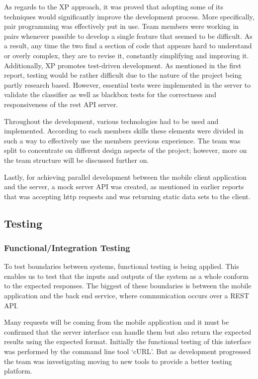 As regards to the XP approach, it was proved that adopting 
some of its techniques would significantly improve the development process. More specifically, pair 
programming was effectively put in use. Team members were working in pairs whenever possible to 
develop a single feature that seemed to be difficult. As a result, any time the two find a section of code 
that appears hard to understand or overly complex, they are to revise it, constantly simplifying and improving it. 
Additionally, XP promotes test-driven development. As mentioned in the 
first report, testing would be rather difficult due to the nature of the project being partly 
research based. However, essential tests were implemented in the server to validate the classifier 
as well as blackbox tests for the correctness and responsiveness of the rest API server. 

Throughout the development, various technologies had to be used and implemented. According to each 
members skills these elements were divided in such a way to effectively use the members previous 
experience. The team was split to concentrate on different design aspects of the project; however, more on the 
team structure will be discussed further on.

Lastly, for achieving parallel development between the mobile client application and the server, 
a mock server API was created, as mentioned in earlier reports that was accepting http requests and 
was returning static data sets to the client. 

\subsection{Testing} 

\subsubsection{Functional/Integration Testing}
To test boundaries between systems, functional testing is being applied. This enables us to test that the inputs and outputs 
of the system as a whole conform to the expected responses. The biggest of these boundaries is between the mobile application and the back
end service, where communication occurs over a REST API.

Many requests will be coming from the mobile application and it must be confirmed that the server interface can handle 
them but also return the expected results using the expected format. Initially the functional testing of this interface was performed by the command line tool `cURL'. 
But as development progressed the team was investigating moving to new tools to provide a better testing platform.

